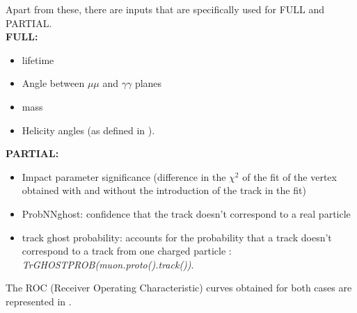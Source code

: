 Apart from these, there are inputs that are specifically used for FULL and PARTIAL. \\

\textbf{FULL:}
\begin{itemize} %
\item \KS lifetime 
\item Angle between $\mu \mu$ and $\gamma\gamma$ planes
\item \Pgpz mass
\item Helicity angles (as defined in ). 
\end{itemize}

\textbf{PARTIAL:}
\begin{itemize} %
\item Impact parameter significance (difference in the $\chi^2$ of the fit of the vertex obtained with and without the introduction of the track in the fit)
\item ProbNNghost: confidence that the track doesn't correspond to a real particle
\item track ghost probability: accounts for the probability that a track doesn't correspond to a track from one charged particle : {\it TrGHOSTPROB(muon.proto().track())}.
\end{itemize}

The ROC (Receiver Operating Characteristic) curves obtained for both cases are represented in . 


